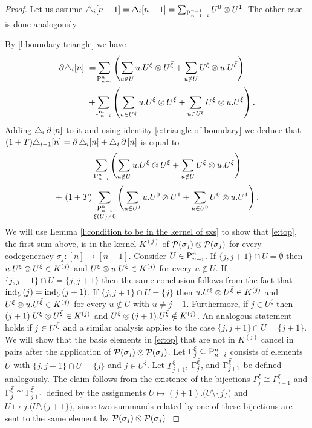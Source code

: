 \iffalse
\begin{proof}
	Let us assume $\triangle_i [n-1] = \Delta_i [n-1] = \sum_{\P_{n-1-i}^{n-1}} U^0 \ot U^1$.
	The other case is done analogously.

	By \cref{l:boundary triangle} we have
	\begin{align*}
	\partial \triangle_i [n]\ & =\! \sum_{\P_{n-i}^n} \left(\sum_{u \notin U} {u.U^\xi} \ot {U^\barxi} +
	\sum_{u \notin U} {U^\xi} \ot {u.U^\barxi} \right) \\ & +\!
	\sum_{\P_{n-i}^n} \left(\sum_{u \in U^\barxi} {u.U^\xi} \ot {U^\barxi} +
	\sum_{u \in U^{\xi}} {U^\xi} \ot {u.U^\barxi} \right).
	\end{align*}
	Adding $\triangle_i \bd \, [n]$ to it and using identity \eqref{e:triangle of boundary} we deduce that $(1+T) \triangle_{i-1} [n] = \bd \triangle_i [n] + \triangle_i \bd \, [n]$ is equal to
	\begin{align}
	\label{e:top} & \sum_{\P_{n-i}^n} \left(\sum_{u \notin U} u.U^\xi \ot U^\barxi +
	\sum_{u \notin U} U^\xi \ot u.U^\barxi \right) \\ +\
	\label{e:bottom} (1+T) & \sum_{\substack{\P_{n-i}^n \\ \xi(U) \neq 0}} \left(\sum_{u \in U^1} {u.U^0} \ot {U^1} +
	\sum_{u \in U^0} {U^0} \ot {u.U^1} \right).
	\end{align}
	We will use Lemma \ref{l:condition to be in the kernel of sxs} to show that \eqref{e:top}, the first sum above, is in the kernel $K^{(j)}$ of $\cP(\sigma_j) \ot \cP(\sigma_j)$ for every codegeneracy $\sigma_j \colon [n] \to [n-1]$.
	Consider $U \in \P_{n-i}^n$.
	If $\{j, j+1\} \cap U = \emptyset$ then $u.U^\xi \ot U^\barxi \in K^{(j)}$ and $U^\xi \ot u.U^\barxi \in K^{(j)}$ for every $u \notin U$.
	If $\{j, j+1\} \cap U = \{j, j+1\}$ then the same conclusion follows from the fact that $\ind_U(j) = \ind_U(j+1)$.
	If $\{j, j+1\} \cap U = \{j\}$ then $u.U^\xi \ot U^\barxi \in K^{(j)}$ and $U^\xi \ot u.U^\barxi \in K^{(j)}$ for every $u \notin U$ with $u \neq j+1$.
	Furthermore, if $j \in U^\xi$ then $(j+1).U^\xi \ot U^\barxi \in K^{(j)}$ and $U^\xi \ot (j+1).U^\barxi \notin K^{(j)}$.
	An analogous statement holds if $j \in U^\barxi$ and a similar analysis applies to the case $\{j, j+1\} \cap U = \{j+1\}$.
	We will show that the basis elements in \eqref{e:top} that are not in $K^{(j)}$ cancel in pairs after the application of $\cP(\sigma_j) \ot \cP(\sigma_j)$.
	Let $\Gamma_j^\xi \subseteq \P_{n-i}^n$ consists of elements $U$ with $\{j, j+1\} \cap U = \{j\}$ and $j \in U^\xi$.
	Let $\Gamma_{j+1}^\xi$, $\Gamma_j^\barxi$, and $\Gamma_{j+1}^\barxi$ be defined analogously.
	The claim follows from the existence of the bijections $\Gamma_{j}^\xi \cong \Gamma_{j+1}^\xi$ and $\Gamma_{j}^\barxi \cong \Gamma_{j+1}^\barxi$ defined by the assignments $U \mapsto (j+1).\big( U \setminus \{j\} \big)$ and $U \mapsto j.\big( U \setminus \{j+1\} \big)$, since two summands related by one of these bijections are sent to the same element by $\cP(\sigma_j) \ot \cP(\sigma_j)$.


\end{proof}
